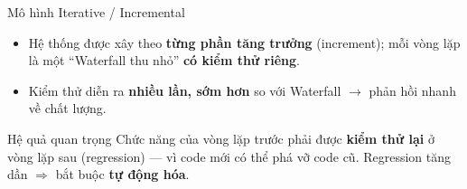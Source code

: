 \documentclass[aspectratio=169,12pt]{beamer}
\begin{document}
\begin{frame}[fragile]{Mô hình Iterative / Incremental}
  \begin{center}
  \end{center}

  \begin{itemize}
    \item Hệ thống được xây theo \textbf{từng phần tăng trưởng} (increment);
          mỗi vòng lặp là một ``Waterfall thu nhỏ'' \textbf{có kiểm thử riêng}.
    \item Kiểm thử diễn ra \textbf{nhiều lần, sớm hơn} so với Waterfall
          $\to$ phản hồi nhanh về chất lượng.
  \end{itemize}

  \begin{alertblock}{Hệ quả quan trọng}
    Chức năng của vòng lặp trước phải được \textbf{kiểm thử lại} ở vòng lặp sau
    (regression) --- vì code mới có thể phá vỡ code cũ. Regression tăng dần
    $\Rightarrow$ bắt buộc \textbf{tự động hóa}.
  \end{alertblock}
\end{frame}
\end{document}
